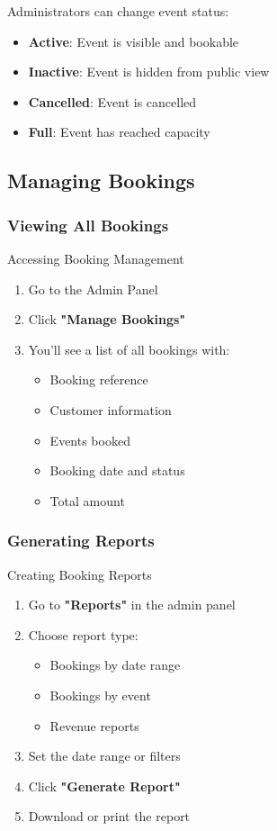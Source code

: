 \documentclass[12pt,a4paper]{article}
\begin{document}
Administrators can change event status:
\begin{itemize}
    \item \textbf{Active}: Event is visible and bookable
    \item \textbf{Inactive}: Event is hidden from public view
    \item \textbf{Cancelled}: Event is cancelled
    \item \textbf{Full}: Event has reached capacity
\end{itemize}

\subsection{Managing Bookings}

\subsubsection{Viewing All Bookings}

\begin{stepbox}{Accessing Booking Management}
\begin{enumerate}
    \item Go to the Admin Panel
    \item Click \textbf{"Manage Bookings"}
    \item You'll see a list of all bookings with:
        \begin{itemize}
            \item Booking reference
            \item Customer information
            \item Events booked
            \item Booking date and status
            \item Total amount
        \end{itemize}
\end{enumerate}
\end{stepbox}

\subsubsection{Generating Reports}

\begin{stepbox}{Creating Booking Reports}
\begin{enumerate}
    \item Go to \textbf{"Reports"} in the admin panel
    \item Choose report type:
        \begin{itemize}
            \item Bookings by date range
            \item Bookings by event
            \item Revenue reports
        \end{itemize}
    \item Set the date range or filters
    \item Click \textbf{"Generate Report"}
    \item Download or print the report
\end{enumerate}
\end{stepbox}
\end{document}
